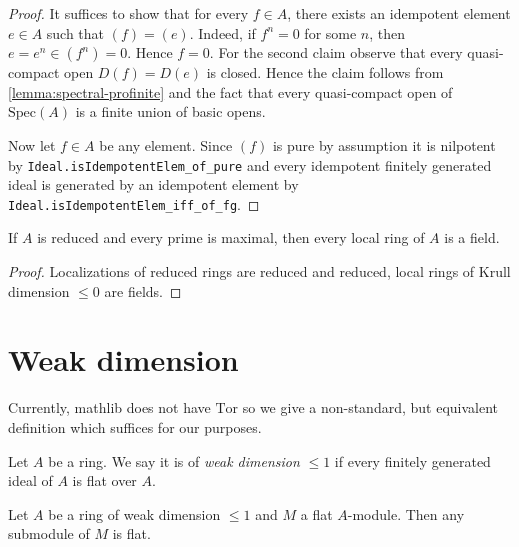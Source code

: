 \begin{proof}
    \leanok
    It suffices to show that for every $f \in A$, there exists an idempotent element $e \in A$ such that
    $(f) = (e)$. Indeed, if $f ^ n = 0$ for some $n$, then $e = e ^ n \in (f ^ n) = 0$. Hence $f = 0$.
    For the second claim observe that every quasi-compact open $D(f) = D(e)$ is closed. Hence the claim
    follows from \ref{lemma:spectral-profinite} and the fact that
    every quasi-compact open of $\mathrm{Spec}(A)$ is a finite union of basic opens.

    Now let $f \in A$ be any element. Since $(f)$ is pure by assumption it is nilpotent
    by \verb`Ideal.isIdempotentElem_of_pure` and every idempotent finitely generated ideal
    is generated by an idempotent element by \verb`Ideal.isIdempotentElem_iff_of_fg`.
\end{proof}

\begin{lemma}
    If $A$ is reduced and every prime is maximal, then every local ring of $A$ is a field.
    \label{lemma:reduced-prime-maximal-field}
    \leanok
\end{lemma}

\begin{proof}
    \leanok
    Localizations of reduced rings are reduced and reduced, local rings of Krull dimension $\le 0$
    are fields.
\end{proof}

\section{Weak dimension}

Currently, mathlib does not have $\mathrm{Tor}$ so we give a non-standard, but equivalent definition which
suffices for our purposes.

\begin{definition}
    Let $A$ be a ring. We say it is of \emph{weak dimension} $\le 1$ if every finitely generated ideal of
    $A$ is flat over $A$.
    \label{def:weak-dim-le-one}
    \leanok
\end{definition}

\begin{lemma}[\stacksproject{092S}, (2) => (4)]
    Let $A$ be a ring of weak dimension $\le 1$ and $M$ a flat $A$-module. Then
    any submodule of $M$ is flat.
    \label{lemma:weak-dim-flat-submodule}
    \leanok
\end{lemma}


